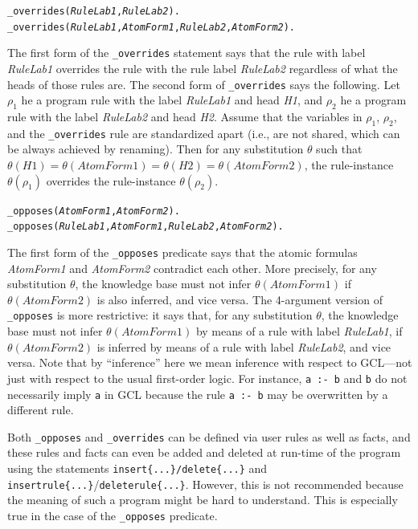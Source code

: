 \documentclass[11pt]{article}
\begin{document}
\begin{alltt}
  _overrides({\em{}RuleLab1},\emph{RuleLab2}).
  _overrides({\em{}RuleLab1},{\em{}AtomForm1},{\em{}RuleLab2},\emph{AtomForm2}).
\end{alltt}
The first form of the {\tt \_overrides} statement says that the rule with
label \emph{RuleLab1} overrides the rule with the rule label
\emph{RuleLab2} regardless of what the heads of those rules are. The second
form of {\tt \_overrides} says the following. Let $\rho_1$ he a program
rule with the label \emph{RuleLab1} and head \emph{H1}, and $\rho_2$ he a
program rule with the label \emph{RuleLab2} and head \emph{H2}. Assume that
the variables in $\rho_1$, $\rho_2$, and the {\tt \_overrides} rule are
standardized apart (i.e., are not shared, which can be always achieved by
renaming).   Then for any substitution $\theta$ such that $\theta(H1) =
\theta(AtomForm1) = \theta(H2) = \theta(AtomForm2)$, the rule-instance
$\theta(\rho_1)$ overrides the rule-instance $\theta(\rho_2)$.
\begin{alltt}
  _opposes({\em{}AtomForm1},\emph{AtomForm2}).
  _opposes({\em{}RuleLab1},{\em{}AtomForm1},{\em{}RuleLab2},\emph{AtomForm2}).
\end{alltt}
The first form of the {\tt \_opposes} predicate says that the atomic
formulas \emph{AtomForm1} and \emph{AtomForm2} contradict each other.  More
precisely, for any substitution $\theta$, the knowledge
base must not infer $\theta(AtomForm1)$ if $\theta(AtomForm2)$ is also
inferred, and vice versa.  The 4-argument version of {\tt \_opposes} is
more restrictive: it says that, for any substitution $\theta$, the
knowledge base must not infer $\theta(AtomForm1)$ by means of a rule with
label \emph{RuleLab1}, if $\theta(AtomForm2)$ is inferred by means of a
rule with label \emph{RuleLab2}, and vice versa.
Note that by ``inference'' here we mean inference with respect to GCL---not just
with respect to the usual first-order logic. For instance, {\tt a :- b} and
{\tt b} do not necessarily imply {\tt a} in GCL because the rule {\tt a :-
  b} may be overwritten by a different rule.      

Both {\tt \_opposes} and {\tt \_overrides} can be defined via user rules
as well as facts, and these rules and facts can even be added and deleted
at run-time of the program using the statements {\tt insert\{...\}/delete\{...\}} and {\tt
  insertrule\{...\}}/{\tt deleterule\{...\}}.
However, this is not recommended because the meaning of such a
program might be hard to understand. This is especially true in the case of
the {\tt \_opposes} predicate.
\end{document}
